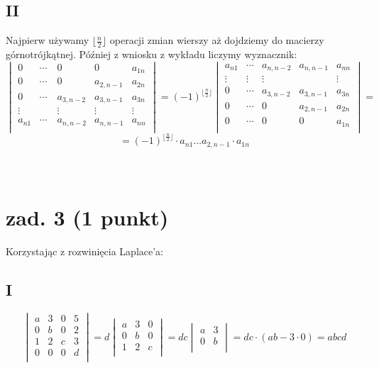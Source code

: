 \documentclass{article}
\begin{document}
\subsection*{II}
Najpierw używamy $\lfloor{\frac{n}{2}} \rfloor$ operacji zmian wierszy aż dojdziemy do macierzy górnotrójkątnej. Później z wniosku z wykładu liczymy wyznacznik:
$$
\begin{vmatrix}
0 & \cdots & 0 & 0 & a_{1n} \\
0 & \cdots & 0 & a_{2,n-1} & a_{2n} \\
0 & \cdots & a_{3,n-2} & a_{3,n-1} & a_{3n} \\
\vdots & \quad & \vdots & \vdots & \vdots\\
a_{n1} & \cdots & a_{n,n-2} & a_{n,n-1} & a_{nn} \\
\end{vmatrix} = {(-1)}^{\lfloor{\frac{n}{2}} \rfloor}
\begin{vmatrix}
a_{n1} & \cdots & a_{n,n-2} & a_{n,n-1} & a_{nn} \\
\vdots & \vdots & \vdots & \quad & \vdots \\
0 & \cdots & a_{3,n-2} & a_{3,n-1} & a_{3n} \\
0 & \cdots & 0 & a_{2,n-1} & a_{2n} \\
0 & \cdots & 0 & 0 & a_{1n} \\
\end{vmatrix} = 
$$
$$
= {(-1)}^{\lfloor{\frac{n}{2}} \rfloor} \cdot a_{n1} \dots a_{2,n-1} \cdot a_{1n}
$$
\\\\
\section{zad. 3 (1 punkt)}
Korzystając z rozwinięcia Laplace'a:
\subsection*{I}
$$
\begin{vmatrix}
a & 3 & 0 & 5 \\
0 & b & 0 & 2 \\
1 & 2 & c & 3 \\
0 & 0 & 0 & d \\
\end{vmatrix} =
d
\begin{vmatrix}
a & 3 & 0 \\
0 & b & 0 \\
1 & 2 & c \\
\end{vmatrix} =
dc
\begin{vmatrix}
a & 3\\
0 & b\\
\end{vmatrix} =dc \cdot (ab - 3\cdot0) = abcd
$$
\end{document}
